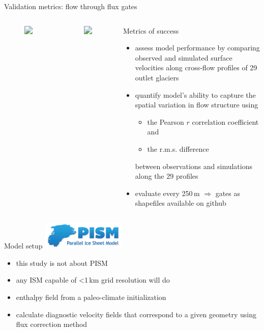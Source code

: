 \documentclass[hide notes,intlimits]{beamer}
\begin{document}
\begin{frame}{Validation metrics: flow through flux gates}
  \vspace{-1em}
  \begin{columns}
    \column[c]{4cm}
    \begin{figure}
      \includegraphics<1>[width=3cm]{upernavik-gate-zoom}
    \end{figure}
    \begin{figure}
      \includegraphics<1>[width=4cm]{Kong_Oscar_Gletscher_velsurf_normal_profile_250m_greenland_2008-2009_grid_mo14_flow_sel_green}
    \end{figure}
    \column[c]{7cm}
    \begin{block}{Metrics of success}
      \begin{itemize}
      \item assess model performance by comparing observed and simulated surface velocities along cross-flow profiles of 29  outlet glaciers
      \item quantify model's ability to capture the spatial variation in flow structure using \vspace{-.75em}
        \begin{itemize}
        \item the Pearson $r$ correlation coefficient and 
        \item the r.m.s. difference
        \end{itemize}
        between observations and simulations along the 29 profiles
      \item evaluate every 250\,m \alert{$\Rightarrow$ gates as shapefiles available on github}
      \end{itemize}
    \end{block}
  \end{columns}
\end{frame}


\begin{frame}{Model setup}
  \includegraphics[width=4cm]{pism-logo}
  \begin{itemize}
  \item this study is not about PISM
  \item any ISM capable of <1\,km grid resolution will do
  \item enthalpy field from a paleo-climate initialization
  \item calculate diagnostic velocity fields that correspond to a given geometry using flux correction method
  \end{itemize}
\end{frame}
\end{document}
